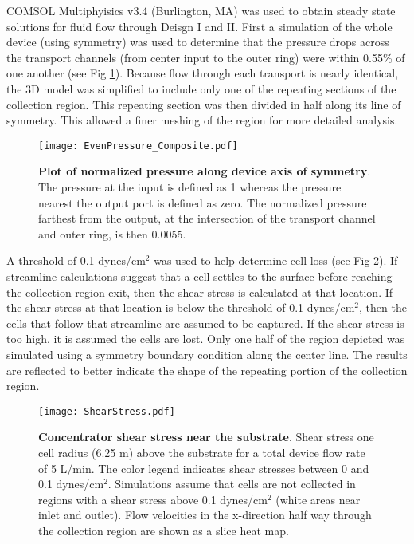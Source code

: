 COMSOL Multiphyisics v3.4 (Burlington, MA) was used to obtain steady state solutions for fluid flow through Deisgn I and II. First a simulation of the whole device (using symmetry) was used to determine that the pressure drops across the transport channels (from center input to the outer ring) were within 0.55\% of one another (see Fig \ref{fig:evenPressure}). Because flow through each transport is nearly identical, the 3D model was simplified to include only one of the repeating sections of the collection region. This repeating section was then divided in half along its line of symmetry. This allowed a finer meshing of the region for more detailed analysis.

\begin{figure}[!b]
\centering
\texttt{[image: EvenPressure\_Composite.pdf]}
\caption{\textbf{Plot of normalized pressure along device axis of symmetry}. The pressure at the input is defined as 1 whereas the pressure nearest the output port is defined as zero. The normalized pressure farthest from the output, at the intersection of the transport channel and outer ring, is then 0.0055.}
\label{fig:evenPressure}
\end{figure}

A threshold of 0.1 dynes/cm$^{2}$ was used to help determine cell loss (see Fig \ref{fig:shearStress}). If streamline calculations suggest that a cell settles to the surface before reaching the collection region exit, then the shear stress is calculated at that location. If the shear stress at that location is below the threshold of 0.1 dynes/cm$^{2}$, then the cells that follow that streamline are assumed to be captured. If the shear stress is too high, it is assumed the cells are lost. Only one half of the region depicted was simulated using a symmetry boundary condition along the center line. The results are reflected to better indicate the shape of the repeating portion of the collection region.

\begin{figure}[!b]
\centering
\texttt{[image: ShearStress.pdf]}
\caption{\textbf{Concentrator shear stress near the substrate}. Shear stress one cell radius (6.25 \textmu m) above the substrate for a total device flow rate of 5 \textmu L/min. The color legend indicates shear stresses between 0 and 0.1 dynes/cm$^{2}$. Simulations assume that cells are not collected in regions with a shear stress above 0.1 dynes/cm$^{2}$ (white areas near inlet and outlet). Flow velocities in the x-direction half way through the collection region are shown as a slice heat map.}
\label{fig:shearStress}
\end{figure}

